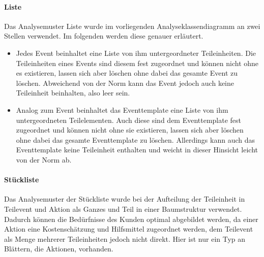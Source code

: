 \paragraph{Liste}
Das Analysemuster Liste wurde im vorliegenden Analyseklassendiagramm an zwei Stellen verwendet. Im folgenden werden diese genauer erläutert.
\begin{itemize}
    \item Jedes Event beinhaltet eine Liste von ihm untergeordneter Teileinheiten. Die Teileinheiten eines Events sind diesem fest zugeordnet und können nicht ohne es existieren, lassen sich aber löschen ohne dabei das gesamte Event zu löschen. Abweichend von der Norm kann das Event jedoch auch keine Teileinheit beinhalten, also leer sein.
    \item Analog zum Event beinhaltet das Eventtemplate eine Liste von ihm untergeordneten Teilelementen. Auch diese sind dem Eventtemplate fest zugeordnet und können nicht ohne sie existieren, lassen sich aber löschen ohne dabei das gesamte Eventtemplate zu löschen. Allerdings kann auch das Eventtemplate keine Teileinheit enthalten und weicht in dieser Hinsicht leicht von der Norm ab.
\end{itemize}

\paragraph{Stückliste}
Das Analysemuster der Stückliste wurde bei der Aufteilung der Teileinheit in Teilevent und Aktion als Ganzes und Teil in einer Baumstruktur verwendet. Dadurch können die Bedürfnisse des Kunden optimal abgebildet werden, da einer Aktion eine Kostenschätzung und Hilfsmittel zugeordnet werden, dem Teilevent als Menge mehrerer Teileinheiten jedoch nicht direkt. Hier ist nur ein Typ an Blättern, die Aktionen, vorhanden.